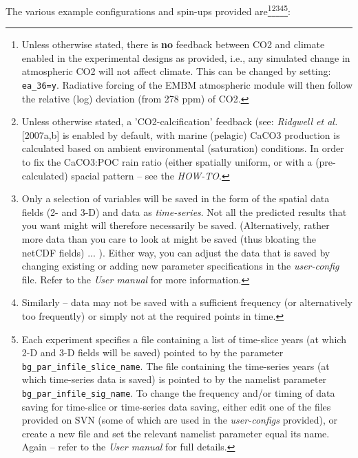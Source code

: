 \documentclass[10pt,twoside]{article}
\begin{document}
\noindent The various example configurations and spin-ups provided are\footnote{Unless otherwise stated, there is \textbf{no} feedback between CO2 and climate enabled in the experimental designs as provided, i.e., any simulated change in atmospheric CO2 will not affect climate. This can be changed by setting: \texttt{ea\_36=y}. Radiative forcing of the EMBM atmospheric module will then follow the relative (log) deviation (from 278 ppm) of CO2.}\footnote{Unless otherwise stated, a 'CO2-calcification' feedback (see: \textit{Ridgwell et al.} [2007a,b] is enabled by default, with marine (pelagic) CaCO3 production is calculated based on ambient environmental (saturation) conditions. In order to fix the CaCO3:POC rain ratio (either spatially uniform, or with a (pre-calculated) spacial pattern -- see the \textit{HOW-TO}.}\footnote{Only a selection of variables will be saved in the form of the spatial data fields (2- and 3-D) and data as \textit{time-series}. Not all the predicted results that you want might will therefore necessarily be saved. (Alternatively, rather more data than you care to look at might be saved (thus bloating the netCDF fields) ... ). Either way, you can adjust the data that is saved by changing existing or adding new parameter specifications in the \textit{user-config} file. Refer to the \textit{User manual} for more information.}\footnote{Similarly -- data may not be saved with a sufficient frequency (or alternatively too frequently) or simply not at the required points in time.}\footnote{Each experiment specifies a file containing a list of time-slice years (at which 2-D and 3-D fields will be saved) pointed to by the parameter \texttt{bg\_par\_infile\_slice\_name}. The file containing the time-series years (at which time-series data is saved) is pointed to by the namelist parameter \texttt{bg\_par\_infile\_sig\_name}. To change the frequency and/or timing of data saving for time-slice or time-series data saving, either edit one of the files provided on SVN (some of which are used in the \textit{user-configs} provided), or create a new file and set the relevant namelist parameter equal its name. Again -- refer to the \textit{User manual} for full details.}:
\end{document}
